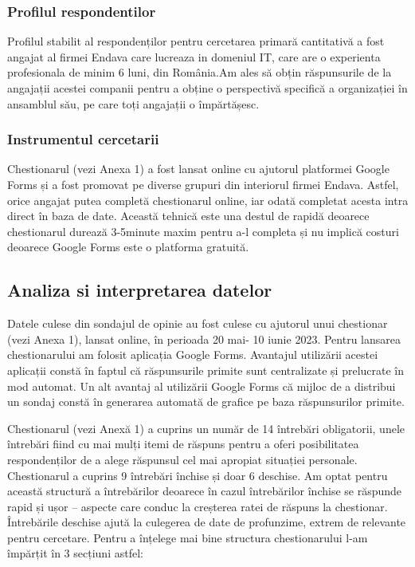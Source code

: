 \documentclass[a4paper, 12pt]{article}
\begin{document}
		\subsubsection{Profilul respondentilor}
	\quad Profilul stabilit al respondenților pentru cercetarea primară cantitativă a fost angajat al firmei Endava care lucreaza in domeniul IT, care are  o experienta profesionala de minim 6 luni, din România.Am ales să obțin răspunsurile de la angajații acestei companii pentru a obține o perspectivă specifică a organizației în ansamblul său, pe care toți angajații o împărtășesc.
		
	\subsubsection{Instrumentul cercetarii}

	\quad Chestionarul (vezi Anexa 1) a fost lansat online cu ajutorul platformei Google Forms și a fost promovat  pe diverse grupuri din interiorul firmei Endava. Astfel, orice angajat putea completă chestionarul online, iar odată completat acesta intra direct în baza de date. Această tehnică este una destul de rapidă deoarece chestionarul durează 3-5minute maxim pentru a-l completa și nu implică costuri deoarece Google Forms este o platforma gratuită.

	\subsection{Analiza si interpretarea datelor}

	\quad Datele culese din sondajul de opinie au fost culese cu ajutorul unui chestionar (vezi Anexa 1), lansat online, în perioada 20 mai- 10 iunie 2023. Pentru lansarea chestionarului am folosit aplicația Google Forms. Avantajul utilizării acestei aplicații constă în faptul că răspunsurile primite sunt centralizate și prelucrate în mod automat. Un alt avantaj al utilizării Google Forms că mijloc de a distribui un sondaj constă în generarea automată de grafice pe baza răspunsurilor primite. 	

	\quad Chestionarul (vezi Anexă 1) a cuprins un număr de 14 întrebări obligatorii, unele întrebări fiind cu mai mulți itemi de răspuns pentru a oferi posibilitatea respondenților de a alege răspunsul cel mai apropiat situației personale. Chestionarul a cuprins 9 întrebări închise și doar 6 deschise. Am optat pentru această structură a întrebărilor deoarece în cazul întrebărilor închise se răspunde rapid și ușor – aspecte care conduc la creșterea ratei de răspuns la chestionar. Întrebările deschise  ajută la culegerea de date de profunzime, extrem de relevante pentru cercetare.  Pentru a înțelege mai bine structura chestionarului l-am împărțit în 3 secțiuni astfel:
\end{document}
